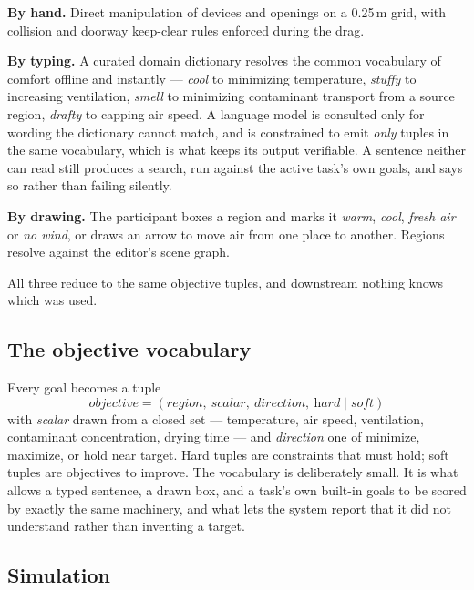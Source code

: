 \documentclass[manuscript,review,anonymous]{acmart}
\begin{document}
\textbf{By hand.} Direct manipulation of devices and openings on a 0.25\,m grid,
with collision and doorway keep-clear rules enforced during the drag.

\textbf{By typing.} A curated domain dictionary resolves the common vocabulary
of comfort offline and instantly --- \emph{cool} to minimizing temperature,
\emph{stuffy} to increasing ventilation, \emph{smell} to minimizing contaminant
transport from a source region, \emph{drafty} to capping air speed. A language
model is consulted only for wording the dictionary cannot match, and is
constrained to emit \emph{only} tuples in the same vocabulary, which is what
keeps its output verifiable. A sentence neither can read still produces a
search, run against the active task's own goals, and says so rather than failing
silently.

\textbf{By drawing.} The participant boxes a region and marks it \emph{warm},
\emph{cool}, \emph{fresh air} or \emph{no wind}, or draws an arrow to move air
from one place to another. Regions resolve against the editor's scene graph.

All three reduce to the same objective tuples, and downstream nothing knows
which was used.

\subsection{The objective vocabulary}

Every goal becomes a tuple
\[
  \textit{objective} = (\textit{region},\ \textit{scalar},\ \textit{direction},\
  \textit{hard} \mid \textit{soft})
\]
with \textit{scalar} drawn from a closed set --- temperature, air speed,
ventilation, contaminant concentration, drying time --- and \textit{direction}
one of minimize, maximize, or hold near target. Hard tuples are constraints that
must hold; soft tuples are objectives to improve. The vocabulary is deliberately
small. It is what allows a typed sentence, a drawn box, and a task's own
built-in goals to be scored by exactly the same machinery, and what lets the
system report that it did not understand rather than inventing a target.

\subsection{Simulation}
\label{sec:sim}
\end{document}
